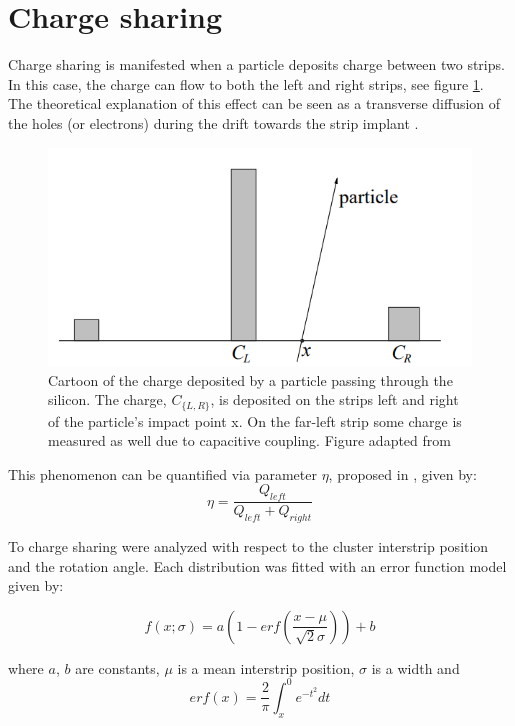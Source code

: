 \section{Charge sharing}
Charge sharing is manifested when a particle deposits charge between two strips.  In this case, the charge can flow to both the left and right strips, see figure \ref{fig:eta}. The theoretical explanation of this effect can be seen as a transverse diffusion of the holes (or electrons) during the drift towards the strip implant \cite{semiconductors_det_sys}. 
 

\begin{figure}[htb]
\centering
\includegraphics[scale=0.8]{figures/eta/eta.PNG}
\caption{Cartoon of the charge deposited by a particle passing through the silicon. The charge, $C_{\{L, R\}}$, is deposited on the strips left and right of the particle’s impact point x. On the far-left strip some charge is measured as well due to capacitive coupling. Figure adapted from \cite{eta_note} } 
\label{fig:eta}
\end{figure}

This phenomenon can be quantified via parameter $\eta$, proposed in \cite{eta}, given by:
\begin{equation}
    \eta = \frac{Q_{left}}{Q_{left}+Q_{right}}
\end{equation}

To charge sharing were analyzed with respect to the cluster interstrip position and the rotation angle. Each distribution was fitted with an error function model given by:

\begin{equation}
\label{eq:eta_model}
f(x;\sigma) = a \left(1 - erf(\frac{x-\mu}{\sqrt{2}\sigma})\right) + b
\end{equation}

where $a$, $b$ are constants,  $\mu$ is a mean interstrip position, $\sigma$ is a width and 
\begin{equation}
erf(x) = \frac{2}{\pi} \int^{0}_{x} e^{-t^2} dt
\end{equation}

